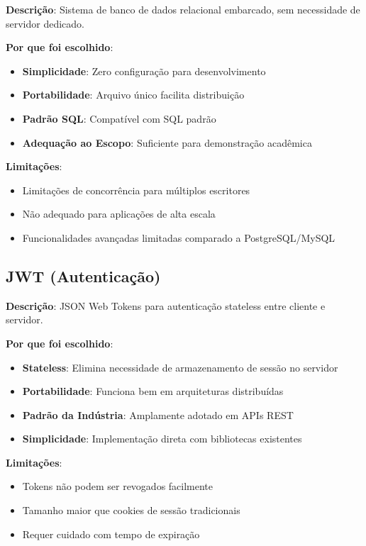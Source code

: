 \documentclass[12pt,a4paper]{article}
\begin{document}
\textbf{Descrição}: Sistema de banco de dados relacional embarcado, sem necessidade de servidor dedicado.

\textbf{Por que foi escolhido}:
\begin{itemize}
    \item \textbf{Simplicidade}: Zero configuração para desenvolvimento
    \item \textbf{Portabilidade}: Arquivo único facilita distribuição
    \item \textbf{Padrão SQL}: Compatível com SQL padrão
    \item \textbf{Adequação ao Escopo}: Suficiente para demonstração acadêmica
\end{itemize}

\textbf{Limitações}:
\begin{itemize}
    \item Limitações de concorrência para múltiplos escritores
    \item Não adequado para aplicações de alta escala
    \item Funcionalidades avançadas limitadas comparado a PostgreSQL/MySQL
\end{itemize}

\subsection{JWT (Autenticação)}

\textbf{Descrição}: JSON Web Tokens para autenticação stateless entre cliente e servidor.

\textbf{Por que foi escolhido}:
\begin{itemize}
    \item \textbf{Stateless}: Elimina necessidade de armazenamento de sessão no servidor
    \item \textbf{Portabilidade}: Funciona bem em arquiteturas distribuídas
    \item \textbf{Padrão da Indústria}: Amplamente adotado em APIs REST
    \item \textbf{Simplicidade}: Implementação direta com bibliotecas existentes
\end{itemize}

\textbf{Limitações}:
\begin{itemize}
    \item Tokens não podem ser revogados facilmente
    \item Tamanho maior que cookies de sessão tradicionais
    \item Requer cuidado com tempo de expiração
\end{itemize}
\end{document}
